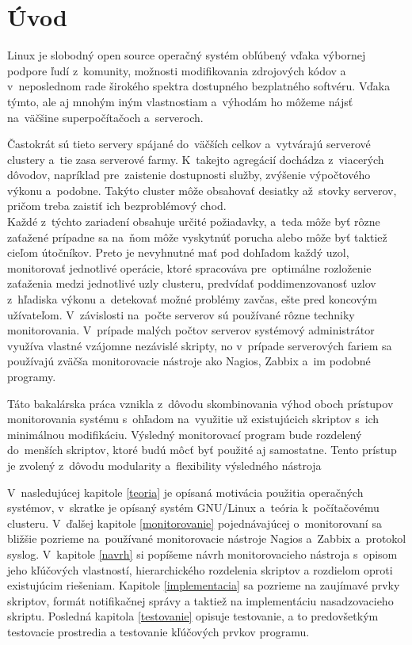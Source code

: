 
\chapter{Úvod}
Linux je slobodný open source operačný systém obľúbený vďaka výbornej podpore ľudí z~komunity, možnosti modifikovania zdrojových kódov a v~neposlednom rade širokého spektra dostupného bezplatného softvéru. Vďaka týmto, ale aj mnohým iným vlastnostiam a~výhodám  ho môžeme nájsť na~väčšine superpočítačoch a~serveroch.

Častokrát sú tieto servery spájané do~väčších celkov a~vytvárajú serverové clustery a~tie zasa serverové farmy. K~takejto agregácií dochádza z~viacerých dôvodov, napríklad pre~zaistenie dostupnosti služby, zvýšenie výpočtového výkonu a~podobne. Takýto cluster môže obsahovať desiatky až~stovky serverov, pričom treba zaistiť ich bezproblémový chod. \\ Každé z~týchto zariadení obsahuje určité požiadavky, a~teda môže byť rôzne zaťažené prípadne sa na~ňom môže vyskytnúť porucha alebo môže byť taktiež cieľom útočníkov. Preto je nevyhnutné mať pod dohľadom každý uzol, monitorovať jednotlivé operácie, ktoré spracováva pre~optimálne rozloženie zaťaženia medzi jednotlivé uzly clusteru, predvídať poddimenzovanosť uzlov z~hľadiska výkonu a~detekovať možné problémy zavčas, ešte pred koncovým užívateľom. V~závislosti na~počte serverov sú používané rôzne techniky monitorovania. V~prípade malých počtov serverov systémový administrátor využíva vlastné vzájomne nezávislé skripty, no v~prípade serverových fariem sa používajú zväčša monitorovacie nástroje ako Nagios, Zabbix a~im podobné programy.

Táto bakalárska práca vznikla z~dôvodu skombinovania výhod oboch prístupov monitorovania systému s~ohľadom na~využitie už existujúcich skriptov s~ich minimálnou \mbox{modifikáciu}. Výsledný monitorovací program bude rozdelený do~menších skriptov, ktoré budú môcť byť použité aj samostatne. Tento prístup je zvolený z~dôvodu modularity a~flexibility výsledného nástroja

V~nasledujúcej kapitole \ref{teoria} je opísaná motivácia použitia operačných systémov, v~skratke je opísaný systém GNU/Linux a~teória k~počítačovému clusteru. V~ďalšej kapitole \ref{monitorovanie} pojednávajúcej o~monitorovaní sa bližšie pozrieme na~používané monitorovacie nástroje Nagios a~Zabbix a~protokol syslog. V~kapitole \ref{navrh} si popíšeme návrh monitorovacieho nástroja s~opisom jeho kľúčových vlastností, hierarchického rozdelenia skriptov a rozdielom oproti existujúcim riešeniam. Kapitole \ref{implementacia} sa pozrieme na zaujímavé prvky skriptov, formát notifikačnej správy a taktiež na implementáciu nasadzovacieho skriptu. Posledná kapitola \ref{testovanie} opisuje testovanie, a to predovšetkým testovacie prostredia a testovanie kľúčových prvkov programu.
  


